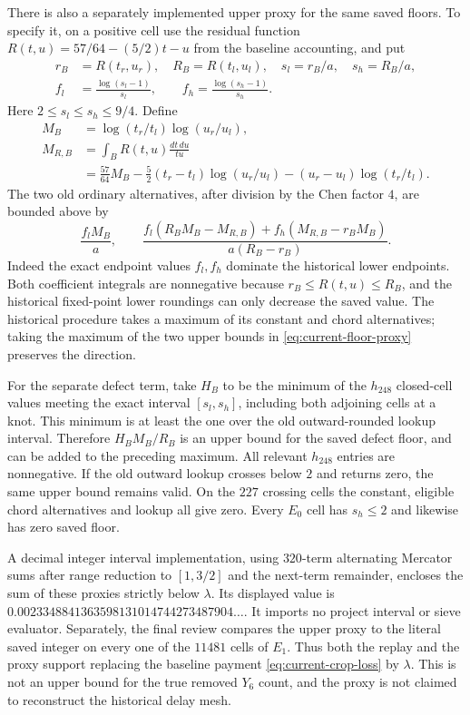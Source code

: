 There is also a separately implemented upper proxy for the same
saved floors.  To specify it, on a positive cell use the residual
function $R(t,u)=57/64-(5/2)t-u$ from the baseline accounting,
and put
\begin{align*}
 r_B&=R(t_r,u_r),\quad R_B=R(t_l,u_l),\quad
 s_l=r_B/a,\quad s_h=R_B/a,\\
 f_l&=\frac{\log(s_l-1)}{s_l},\qquad
 f_h=\frac{\log(s_h-1)}{s_h}.
\end{align*}
Here $2\le s_l\le s_h\le9/4$.  Define
\begin{align*}
 M_B&=\log(t_r/t_l)\log(u_r/u_l),\\
 M_{R,B}
 &=\int_B R(t,u)\frac{dt\,du}{tu}\\
 &=\frac{57}{64}M_B
   -\frac52(t_r-t_l)\log(u_r/u_l)
   -(u_r-u_l)\log(t_r/t_l).
\end{align*}
The two old ordinary alternatives, after division by the Chen
factor $4$, are bounded above by
\begin{equation}
 \frac{f_lM_B}{a},
 \qquad
 \frac{f_l(R_BM_B-M_{R,B})+
       f_h(M_{R,B}-r_BM_B)}{a(R_B-r_B)}.
 \label{eq:current-floor-proxy}
\end{equation}
Indeed the exact endpoint values $f_l,f_h$ dominate the
historical lower endpoints.  Both coefficient integrals are
nonnegative because $r_B\le R(t,u)\le R_B$, and the historical
fixed-point lower roundings can only decrease the saved value.
The historical procedure takes a maximum of its constant and
chord alternatives; taking the maximum of the two upper bounds
in \eqref{eq:current-floor-proxy} preserves the direction.

For the separate defect term, take $H_B$ to be the minimum of
the $h_{248}$ closed-cell values meeting the exact interval
$[s_l,s_h]$, including both adjoining cells at a knot.  This
minimum is at least the one over the old outward-rounded lookup
interval.  Therefore $H_BM_B/R_B$ is an upper bound for the
saved defect floor, and can be added to the preceding maximum.
All relevant $h_{248}$ entries are nonnegative.  If the old
outward lookup crosses below $2$ and returns zero, the same
upper bound remains valid.  On the $227$ crossing cells the
constant, eligible chord alternatives and lookup all give zero.
Every $E_0$ cell has $s_h\le2$ and likewise has zero saved floor.

A decimal integer interval implementation, using $320$-term
alternating Mercator sums after range reduction to $[1,3/2]$
and the next-term remainder, encloses the sum of these proxies
strictly below $\lambda$.  Its displayed value is
$0.0023348841363598131014744273487904\ldots$.
It imports no project interval or sieve evaluator.  Separately,
the final review compares the upper proxy to the literal saved
integer on every one of the $11481$ cells of $E_1$.
Thus both the replay and the proxy support replacing the baseline
payment \eqref{eq:current-crop-loss} by $\lambda$.  This is not
an upper bound for the true removed $Y_6$ count, and the proxy
is not claimed to reconstruct the historical delay mesh.

